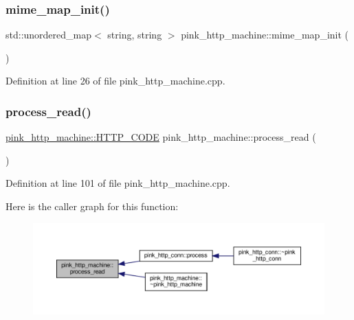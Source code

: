 \subsubsection{\texorpdfstring{mime\+\_\+map\+\_\+init()}{mime\_map\_init()}}
{\footnotesize\ttfamily std\+::unordered\+\_\+map$<$ string, string $>$ pink\+\_\+http\+\_\+machine\+::mime\+\_\+map\+\_\+init (\begin{DoxyParamCaption}{ }\end{DoxyParamCaption})\hspace{0.3cm}{\ttfamily [static]}}



Definition at line 26 of file pink\+\_\+http\+\_\+machine.\+cpp.

\mbox{\label{classpink__http__machine_a7c937bd8da6bdfbf4894e6af9a712d60}} 
\subsubsection{\texorpdfstring{process\+\_\+read()}{process\_read()}}
{\footnotesize\ttfamily \hyperlink{classpink__http__machine_afb1e590cd61676c2f8859c4e01e5b150}{pink\+\_\+http\+\_\+machine\+::\+H\+T\+T\+P\+\_\+\+C\+O\+DE} pink\+\_\+http\+\_\+machine\+::process\+\_\+read (\begin{DoxyParamCaption}{ }\end{DoxyParamCaption})}



Definition at line 101 of file pink\+\_\+http\+\_\+machine.\+cpp.

Here is the caller graph for this function\+:\nopagebreak
\begin{figure}[H]
\begin{center}
\leavevmode
\includegraphics[width=350pt]{classpink__http__machine_a7c937bd8da6bdfbf4894e6af9a712d60_icgraph}
\end{center}
\end{figure}
\mbox{\label{classpink__http__machine_a7144e4279cd09ab8ce56873bd3906f24}} 
